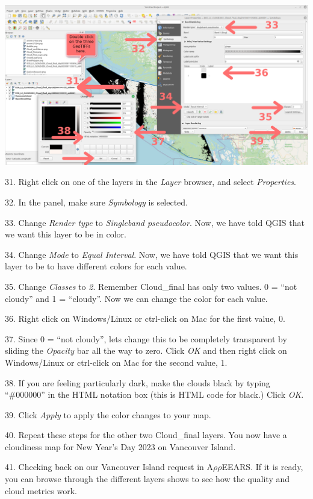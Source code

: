\documentclass[oneside,a4paper,11pt,explicit]{book}
\begin{document}
	\centerline{\includegraphics[width=\textwidth]{Cloud_final_AddLayer.png}}
	
	31. Right click on one of the layers in the \textit{Layer} browser, and select \textit{Properties}.
	
	32. In the panel, make sure \textit{Symbology} is selected.
	
	33. Change \textit{Render type} to \textit{Singleband pseudocolor}. Now, we have told QGIS that we want this layer to be in color.
	
	34. Change \textit{Mode} to \textit{Equal Interval}. Now, we have told QGIS that we want this layer to be to have different colors for each value. 
	
	35. Change \textit{Classes} to \textit{2}. Remember Cloud\_final has only two values. 0 = ``not cloudy'' and 1 = ``cloudy''. Now we can change the color for each value.
	
	36. Right click on Windows/Linux or ctrl-click on Mac for the first value, 0. 
	
	37. Since 0 = ``not cloudy'', lets change this to be completely transparent by sliding the \textit{Opacity} bar all the way to zero. Click \textit{OK} and then right click on Windows/Linux or ctrl-click on Mac for the second value, 1. 
	
	38. If you are feeling particularly dark, make the clouds black by typing ``\#000000'' in the HTML notation box (this is HTML code for black.) Click \textit{OK}.
	
	39. Click \textit{Apply} to apply the color changes to your map.
	
	40. Repeat these steps for the other two Cloud\_final layers. You now have a cloudiness map for New Year's Day 2023 on Vancouver Island.
	
	41. Checking back on our Vancouver Island request in A$\rho\rho$EEARS. If it is ready, you can browse through the different layers shows to see how the quality and cloud metrics work. 
	
\end{document}

